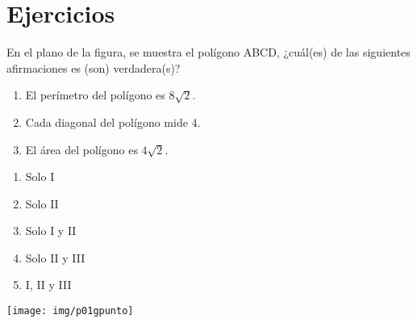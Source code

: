 \section{Ejercicios}

\begin{enumerate}[label=\large{\textbf{\arabic*.}}, itemsep = 0.15cm, topsep = 0.5cm]
	
	\parbox{1\linewidth}{\item En el plano de la figura, se muestra el polígono ABCD, ¿cuál(es) de las siguientes afirmaciones es (son) verdadera(s)? 
		\begin{enumerate}[label={\Roman*)}, itemsep = 0.5cm, topsep = 0.5cm, leftmargin = 2.4cm]
			\item El perímetro del polígono es $8\sqrt{2}$.
			\item Cada diagonal del polígono mide 4.
			\item El área del polígono es $4\sqrt{2}$.
		\end{enumerate}
		\begin{minipage}[t][3cm][t]{0.5\linewidth}
			\vspace{0.25cm}
			\begin{enumerate}[label={\Alph*)}, itemsep = 0.15cm, topsep = 0.5cm]
				\item Solo I
				\item Solo II
				\item Solo I y II
				\item Solo II y III
				\item I, II y III
			\end{enumerate}
		\end{minipage}
		\begin{minipage}[t][1cm][t]{0.49\linewidth}
			\vspace{0cm} %
			\hspace{-2cm} %
			\texttt{[image: img/p01gpunto]} %
	\end{minipage}}
	
	\vspace*{1.2cm}
	

\end{enumerate}
